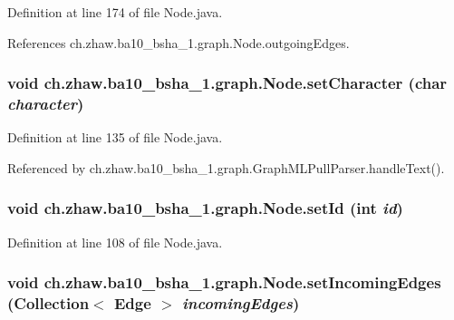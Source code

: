 Definition at line 174 of file Node.java.

References ch.zhaw.ba10\_\-bsha\_\-1.graph.Node.outgoingEdges.\hypertarget{classch_1_1zhaw_1_1ba10__bsha__1_1_1graph_1_1Node_ad1c94b7c86ad5fd14bf0aee9d52189e4}{
\subsubsection[{setCharacter}]{\setlength{\rightskip}{0pt plus 5cm}void ch.zhaw.ba10\_\-bsha\_\-1.graph.Node.setCharacter (char {\em character})}}
\label{classch_1_1zhaw_1_1ba10__bsha__1_1_1graph_1_1Node_ad1c94b7c86ad5fd14bf0aee9d52189e4}


Definition at line 135 of file Node.java.

Referenced by ch.zhaw.ba10\_\-bsha\_\-1.graph.GraphMLPullParser.handleText().\hypertarget{classch_1_1zhaw_1_1ba10__bsha__1_1_1graph_1_1Node_a2d145e592a040c0c608caf33a59e0007}{
\subsubsection[{setId}]{\setlength{\rightskip}{0pt plus 5cm}void ch.zhaw.ba10\_\-bsha\_\-1.graph.Node.setId (int {\em id})}}
\label{classch_1_1zhaw_1_1ba10__bsha__1_1_1graph_1_1Node_a2d145e592a040c0c608caf33a59e0007}


Definition at line 108 of file Node.java.\hypertarget{classch_1_1zhaw_1_1ba10__bsha__1_1_1graph_1_1Node_a18364ede156d636e492a64eeb5306d36}{
\subsubsection[{setIncomingEdges}]{\setlength{\rightskip}{0pt plus 5cm}void ch.zhaw.ba10\_\-bsha\_\-1.graph.Node.setIncomingEdges (Collection$<$ {\bf Edge} $>$ {\em incomingEdges})}}
\label{classch_1_1zhaw_1_1ba10__bsha__1_1_1graph_1_1Node_a18364ede156d636e492a64eeb5306d36}


